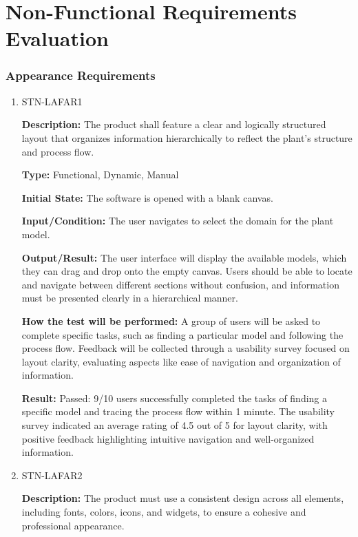 \documentclass[12pt, titlepage]{article}
\begin{document}
\section{Non-Functional Requirements Evaluation}

\subsubsection{Appearance Requirements}

\begin{enumerate}
    \item{STN-LAFAR1\\}

    \textbf{Description:} The product shall feature a clear and logically structured layout that organizes information hierarchically to reflect the plant’s structure and process flow.

    \textbf{Type:} Functional, Dynamic, Manual

    \textbf{Initial State:} The software is opened with a blank canvas.

    \textbf{Input/Condition:} The user navigates to select the domain for the plant model.

    \textbf{Output/Result:} The user interface will display the available models, which they can drag and drop onto the empty canvas. Users should be able to locate and navigate between different sections without confusion, and information must be presented clearly in a hierarchical manner.

    \textbf{How the test will be performed:} A group of users will be asked to complete specific tasks, such as finding a particular model and following the process flow. Feedback will be collected through a usability survey focused on layout clarity, evaluating aspects like ease of navigation and organization of information.

    \textbf{Result:} Passed: 9/10 users successfully completed the tasks of finding a specific model and tracing the process flow within 1 minute. The usability survey indicated an average rating of 4.5 out of 5 for layout clarity, with positive feedback highlighting intuitive navigation and well-organized information.

    \item{STN-LAFAR2\\}

\textbf{Description:} The product must use a consistent design across all elements, including fonts, colors, icons, and widgets, to ensure a cohesive and professional appearance.


\end{enumerate}
\end{document}
